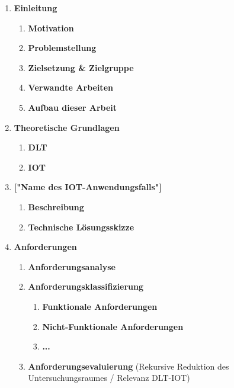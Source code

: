 \documentclass[
    ngerman,american
    ]{scrartcl}
\begin{document}
\begin{enumerate}
            \item \textbf{Einleitung}
                    \begin{enumerate}
                        \item \textbf{Motivation}
                        \item \textbf{Problemstellung}
                        \item \textbf{Zielsetzung \& Zielgruppe}
                        \item \textbf{Verwandte Arbeiten}
                        \item \textbf{Aufbau dieser Arbeit}
                    \end{enumerate}
            \item \textbf{Theoretische Grundlagen}
                    \begin{enumerate}
                        \item \textbf{DLT}
                        \item \textbf{IOT}
                    \end{enumerate}
            \item \textbf{["Name des IOT-Anwendungsfalls"]}
                    \begin{enumerate}
                        \item \textbf{Beschreibung}
                        \item \textbf{Technische Lösungsskizze}
                    \end{enumerate}
            \item \textbf{Anforderungen}
                    \begin{enumerate}
                        \item \textbf{Anforderungsanalyse}
                        \item \textbf{Anforderungsklassifizierung}
				\begin{enumerate}
                        		\item \textbf{Funktionale Anforderungen}
                        		\item \textbf{Nicht-Funktionale Anforderungen}
                        		\item \textbf{...}
                    		\end{enumerate}
                        \item \textbf{Anforderungsevaluierung} (Rekursive Reduktion des Untersuchungsraumes / Relevanz DLT-IOT)
                    \end{enumerate}

\end{enumerate}
\end{document}
